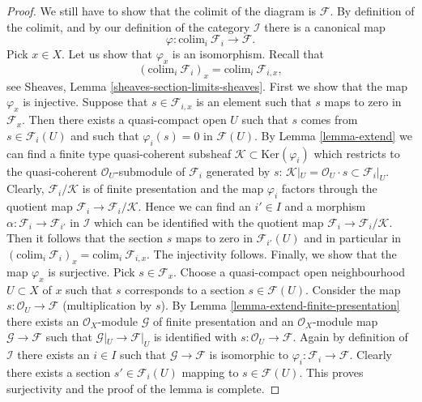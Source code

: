 \begin{proof}
\medskip\noindent
We still have to show that the colimit of the diagram is $\mathcal{F}$.
By definition of the colimit, and by our definition of the category
$\mathcal{I}$ there is a canonical map
$$
\varphi :
\text{colim}_i\ \mathcal{F}_i
\longrightarrow
\mathcal{F}.
$$
Pick $x \in X$. Let us show that $\varphi_x$ is an isomorphism.
Recall that
$$
(\text{colim}_i\ \mathcal{F}_i)_x
=
\text{colim}_i\ \mathcal{F}_{i, x},
$$
see Sheaves, Lemma \ref{sheaves-section-limits-sheaves}.
First we show that the map $\varphi_x$ is injective.
Suppose that $s \in \mathcal{F}_{i, x}$ is an element
such that $s$ maps to zero in $\mathcal{F}_x$. Then there exists
a quasi-compact open $U$ such that $s$ comes from $s \in \mathcal{F}_i(U)$
and such that $\varphi_i(s) = 0$ in $\mathcal{F}(U)$.
By Lemma \ref{lemma-extend}
we can find a finite type quasi-coherent subsheaf
$\mathcal{K} \subset \text{Ker}(\varphi_i)$ which restricts to
the quasi-coherent $\mathcal{O}_U$-submodule of $\mathcal{F}_i$
generated by $s$:
$\mathcal{K}|_U = \mathcal{O}_U\cdot s \subset \mathcal{F}_i|_U$.
Clearly, $\mathcal{F}_i/\mathcal{K}$ is of finite presentation and
the map $\varphi_i$ factors through the quotient map
$\mathcal{F}_i \to \mathcal{F}_i/\mathcal{K}$. Hence we can find
an $i' \in I$ and a morphism $\alpha : \mathcal{F}_i \to \mathcal{F}_{i'}$
in $\mathcal{I}$ which can be identified with the quotient map
$\mathcal{F}_i \to \mathcal{F}_i/\mathcal{K}$. Then it follows
that the section $s$ maps to zero in $\mathcal{F}_{i'}(U)$ and
in particular in
$(\text{colim}_i\ \mathcal{F}_i)_x =
\text{colim}_i\ \mathcal{F}_{i, x}$.
The injectivity follows.
Finally, we show that the map $\varphi_x$ is surjective.
Pick $s \in \mathcal{F}_x$. Choose a quasi-compact open neighbourhood
$U \subset X$ of $x$ such that $s$ corresponds to a section
$s \in \mathcal{F}(U)$. Consider the map
$s : \mathcal{O}_U \to \mathcal{F}$ (multiplication by $s$).
By Lemma \ref{lemma-extend-finite-presentation}
there exists an $\mathcal{O}_X$-module $\mathcal{G}$
of finite presentation and an $\mathcal{O}_X$-module map
$\mathcal{G} \to \mathcal{F}$ such that $\mathcal{G}|_U \to \mathcal{F}|_U$
is identified with
$s : \mathcal{O}_U \to \mathcal{F}$.
Again by definition of $\mathcal{I}$ there exists an $i \in I$
such that $\mathcal{G} \to \mathcal{F}$ is isomorphic to
$\varphi_i : \mathcal{F}_i \to \mathcal{F}$. Clearly there exists
a section $s' \in \mathcal{F}_i(U)$ mapping to $s \in \mathcal{F}(U)$.
This proves surjectivity and the proof of the lemma is complete.
\end{proof}

